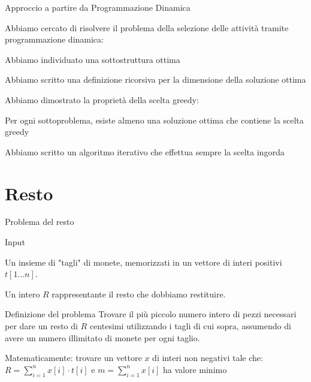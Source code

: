 \begin{frame}{Approccio a partire da Programmazione Dinamica}

\BIL
\item Abbiamo cercato di risolvere il problema della selezione delle attività tramite programmazione dinamica:
\BI
\item Abbiamo individuato una sottostruttura ottima
\item Abbiamo scritto una definizione ricorsiva per la dimensione della soluzione ottima
\EI
\item Abbiamo dimostrato la proprietà della scelta greedy:
\BI
\item Per ogni sottoproblema, esiste almeno una soluzione ottima che contiene la scelta greedy
\item Abbiamo scritto un algoritmo iterativo che effettua sempre la scelta ingorda
\EI
\EIL
\end{frame}

\section{Resto}

\begin{frame}{Problema del resto}

\vspace{-12pt}
\begin{block}{Input}
\BI
\item Un insieme di "tagli" di monete, memorizzati in un vettore di interi positivi $t[1 \ldots n]$.
\item Un intero $R$ rappresentante il resto che dobbiamo restituire.
\EI
\end{block}

\smallskip
\begin{block}{Definizione del problema}
Trovare il più piccolo numero intero di pezzi necessari per dare un resto di $R$ 
centesimi utilizzando i tagli di cui sopra, assumendo di avere un numero illimitato di
monete per ogni taglio.
\end{block}

Matematicamente: trovare un vettore $x$ di interi non negativi tale che:
$\displaystyle
	R = \sum_{i=1}^n x[i] \cdot t[i]
$ \qquad
e \qquad $m = \sum_{i=1}^n x[i]$ ha valore minimo
\end{frame}

